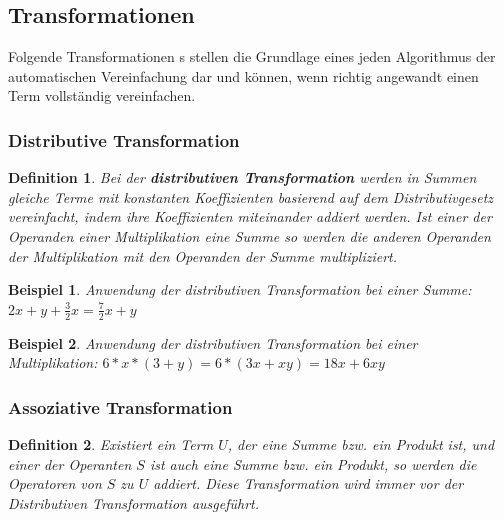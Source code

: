 \documentclass[11pt]{article}
\newtheorem{defin}{Definition}
\newtheorem{example}{Beispiel}
\begin{document}
\subsection{Transformationen}

Folgende Transformationen \citeauthor{CAS_MM}s \cite[64 - 79]{CAS_MM}
stellen die Grundlage eines jeden Algorithmus der automatischen Vereinfachung dar und können,
wenn richtig angewandt einen Term vollständig vereinfachen.

\subsubsection{Distributive Transformation}

\begin{defin}
  \label{def:distributive_transformation}
  Bei der \textbf{distributiven Transformation} werden in Summen 
  gleiche Terme mit konstanten Koeffizienten basierend auf dem Distributivgesetz vereinfacht, 
  indem ihre Koeffizienten miteinander addiert werden. 
  Ist einer der Operanden einer Multiplikation eine Summe so werden die anderen Operanden
  der Multiplikation mit den Operanden der Summe multipliziert.
\end{defin}

\begin{example}
  Anwendung der distributiven Transformation bei einer Summe: \newline
  $2x + y + \frac{3}{2}x = \frac{7}{2}x + y$
\end{example}

\begin{example}
  Anwendung der distributiven Transformation bei einer Multiplikation: \newline
  $6 * x * (3 + y) = 6 * (3x + xy) = 18x + 6xy$
\end{example}

\subsubsection{Assoziative Transformation}

\begin{defin}
  \label{def:assoziative_transformation}
  Existiert ein Term $U$, der eine Summe bzw. ein Produkt ist, und einer der Operanten $S$ ist auch eine Summe 
  bzw. ein Produkt, so werden die Operatoren von $S$ zu $U$ addiert. 
  Diese Transformation wird immer vor der Distributiven Transformation ausgeführt.
\end{defin}
\end{document}
